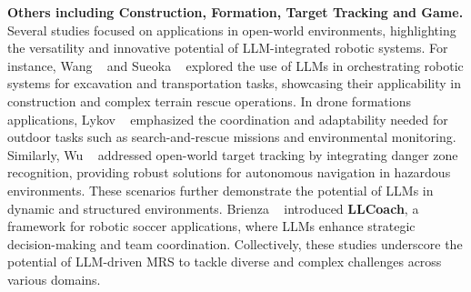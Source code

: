 \noindent\textbf{Others including Construction, Formation, Target Tracking and Game.}
Several studies focused on applications in open-world environments, highlighting the versatility and innovative potential of LLM-integrated robotic systems. For instance, Wang \etal~\cite{wang_dart-llm_2024} and Sueoka \etal~\cite{sueoka_adaptivity_nodate} explored the use of LLMs in orchestrating robotic systems for excavation and transportation tasks, showcasing their applicability in construction and complex terrain rescue operations. In drone formations applications, Lykov \etal~\cite{lykov2024flockgpt} emphasized the coordination and adaptability needed for outdoor tasks such as search-and-rescue missions and environmental monitoring. Similarly, Wu \etal~\cite{wu_hierarchical_2024} addressed open-world target tracking by integrating danger zone recognition, providing robust solutions for autonomous navigation in hazardous environments. These scenarios further demonstrate the potential of LLMs in dynamic and structured environments. Brienza \etal~\cite{brienza_llcoach_2024} introduced \textbf{LLCoach}, a framework for robotic soccer applications, where LLMs enhance strategic decision-making and team coordination. Collectively, these studies underscore the potential of LLM-driven MRS to tackle diverse and complex challenges across various domains. 
